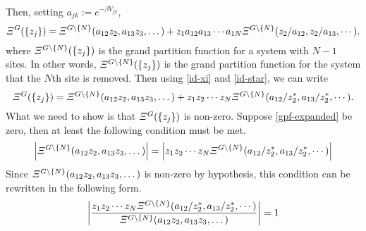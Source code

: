 \documentclass[aps, 12pt]{revtex4-2}
\begin{document}
Then, setting $a_{jk} := e^{-\beta V_{jk}}$,
\begin{dmath}
  \varXi^{G}(\qty{z_j}) = \varXi^{G\backslash \qty{N}}(a_{12}z_2, a_{13}z_3, \dots) + z_1a_{12}a_{13}\cdots a_{1N}\varXi^{G\backslash \qty{N}}(z_{2}/a_{12}, z_2/a_{13}, \cdots).
\end{dmath}
where $\varXi^{G\backslash \qty{N}}(\qty{z_j})$ is the grand partition function for a system with $N - 1$ sites. In other words, $\varXi^{G\backslash \qty{N}}(\qty{z_j})$ is the grand partition function for the system that the $N$th site is removed. Then using \eqref{id-xi} and \eqref{id-star}, we can write
\begin{dmath}
  \varXi^{G}(\qty{z_j}) = \varXi^{G\backslash \qty{N}}(a_{12}z_2, a_{13}z_3, \dots) + z_1z_2 \cdots z_N\varXi^{G\backslash \qty{N}}(a_{12}/z_{2}^*, a_{13}/z_2^*, \cdots). \label{gpf-expanded}
\end{dmath}
What we need to show is that $\varXi^{G}(\qty{z_j})$ is non-zero. Suppose \eqref{gpf-expanded} be zero, then at least the following condition must be met.
\begin{dmath}
  \qty|\varXi^{G\backslash \qty{N}}(a_{12}z_2, a_{13}z_3, \dots)| = \qty|z_1z_2 \cdots z_N\varXi^{G\backslash \qty{N}}(a_{12}/z_{2}^*, a_{13}/z_2^*, \cdots)|
\end{dmath}
Since $\varXi^{G\backslash \qty{N}}(a_{12}z_2, a_{13}z_3, \dots)$ is non-zero by hypothesis, this condition can be rewritten in the following form.
\begin{dmath}
  \qty|\frac{z_1z_2 \cdots z_N\varXi^{G\backslash \qty{N}}(a_{12}/z_{2}^*, a_{13}/z_2^*, \cdots)}{\varXi^{G\backslash \qty{N}}(a_{12}z_2, a_{13}z_3, \dots)}| = 1
\end{dmath}

\end{document}
